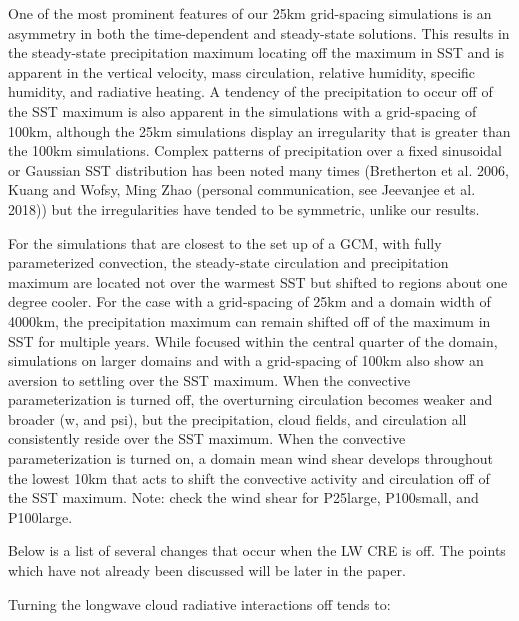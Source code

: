 \documentclass[11pt]{article}   	%
\begin{document}
One of the most prominent features of our 25km grid-spacing simulations is an asymmetry in both the time-dependent and 
steady-state solutions.  This results in the steady-state precipitation maximum locating off the maximum in SST and is apparent in 
the vertical velocity, mass circulation, relative humidity, specific humidity, and radiative heating.   A tendency of the precipitation to 
occur off of the SST maximum is also apparent in the simulations with a grid-spacing of 100km, although the 25km simulations display 
an irregularity that is greater than the 100km simulations.  Complex patterns of precipitation over a fixed sinusoidal or Gaussian SST 
distribution has been noted many times 
(Bretherton et al. 2006, Kuang and Wofsy, Ming Zhao (personal communication, see Jeevanjee et al. 2018)) but the irregularities have 
tended to be symmetric, unlike our results.   

For the simulations that are closest to the set up of a GCM, with fully parameterized convection, the steady-state circulation and 
precipitation maximum are located not over the warmest SST but shifted to regions about one degree cooler.  For the case
with a grid-spacing of 25km and a domain width of 4000km, the precipitation maximum can remain shifted off of the maximum in
SST for multiple years.   While focused within the central quarter of the domain, simulations on larger domains and with a 
grid-spacing of 100km also show an aversion to settling over the SST maximum.   When the convective parameterization
is turned off, the overturning circulation becomes weaker and broader (w, and psi), but the precipitation, cloud fields, and 
circulation all consistently reside over the SST maximum.  When the convective parameterization is turned on, a domain mean 
wind shear develops throughout the lowest 10km that acts to shift the convective activity and circulation off of the SST maximum.  
Note: check the wind shear for P25large, P100small, and P100large. 

Below is a list of several changes that occur when the LW CRE is off.  The points which have not already been discussed will be later in the paper.  

Turning the longwave cloud radiative interactions off tends to: 
\end{document}
